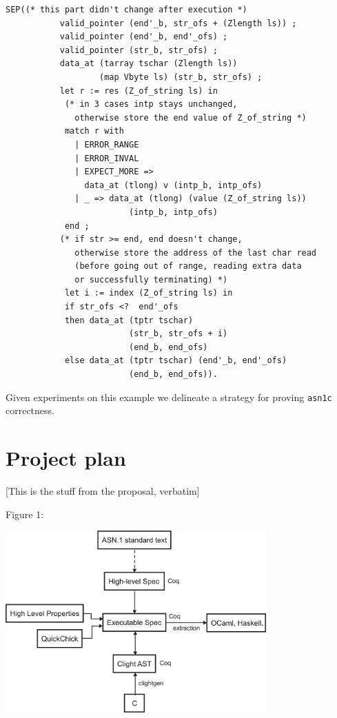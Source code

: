\documentclass[acmsmall,nonacm]{acmart}
\begin{document}
\begin{lstlisting}[language=Coq]
 SEP((* this part didn't change after execution *)
           valid_pointer (end'_b, str_ofs + (Zlength ls)) ;
           valid_pointer (end'_b, end'_ofs) ;
           valid_pointer (str_b, str_ofs) ;
           data_at (tarray tschar (Zlength ls)) 
                   (map Vbyte ls) (str_b, str_ofs) ; 
           let r := res (Z_of_string ls) in
            (* in 3 cases intp stays unchanged,
              otherwise store the end value of Z_of_string *)
            match r with 
              | ERROR_RANGE 
              | ERROR_INVAL 
              | EXPECT_MORE => 
                data_at (tlong) v (intp_b, intp_ofs)
              | _ => data_at (tlong) (value (Z_of_string ls))
                         (intp_b, intp_ofs) 
            end ;
           (* if str >= end, end doesn't change, 
              otherwise store the address of the last char read 
              (before going out of range, reading extra data 
              or successfully terminating) *)
            let i := index (Z_of_string ls) in
            if str_ofs <?  end'_ofs
            then data_at (tptr tschar) 
                         (str_b, str_ofs + i) 
                         (end_b, end_ofs)
            else data_at (tptr tschar) (end'_b, end'_ofs) 
                         (end_b, end_ofs)).
\end{lstlisting}

Given experiments on this example we delineate a strategy for proving \texttt{asn1c} correctness.
\section{Project plan}
[This is the stuff from the proposal, verbatim]

Figure 1:

 \includegraphics[width=10cm]{VerificationArchitectureDiagram.png}
\end{document}
